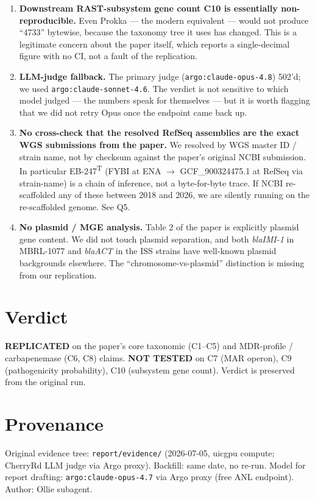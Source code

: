 \documentclass[11pt]{article}
\begin{document}
\begin{enumerate}[leftmargin=*]
    ``pose important health considerations'' clause pivots on a PathogenFinder result we
    did not re-run. PathogenFinder v2 is public and runnable; skipping it was a time
    trade-off, not an inability. Standing follow-up in Q4.
\item \textbf{Downstream RAST-subsystem gene count C10 is essentially non-reproducible.}
    Even Prokka --- the modern equivalent --- would not produce ``4733'' bytewise, because
    the taxonomy tree it uses has changed. This is a legitimate concern about the paper
    itself, which reports a single-decimal figure with no CI, not a fault of the replication.
\item \textbf{LLM-judge fallback.} The primary judge (\texttt{argo:claude-opus-4.8}) 502'd;
    we used \texttt{argo:claude-sonnet-4.6}. The verdict is not sensitive to which model
    judged --- the numbers speak for themselves --- but it is worth flagging that we did not
    retry Opus once the endpoint came back up.
\item \textbf{No cross-check that the resolved RefSeq assemblies are the exact WGS
    submissions from the paper.} We resolved by WGS master ID / strain name, not by
    checksum against the paper's original NCBI submission. In particular EB-247\textsuperscript{T}
    (FYBI at ENA $\to$ GCF\_900324475.1 at RefSeq via strain-name) is a chain of
    inference, not a byte-for-byte trace. If NCBI re-scaffolded any of these between 2018
    and 2026, we are silently running on the re-scaffolded genome. See Q5.
\item \textbf{No plasmid / MGE analysis.} Table 2 of the paper is explicitly plasmid gene
    content. We did not touch plasmid separation, and both \emph{blaIMI-1} in MBRL-1077 and
    \emph{blaACT} in the ISS strains have well-known plasmid backgrounds elsewhere. The
    ``chromosome-vs-plasmid'' distinction is missing from our replication.
\end{enumerate}

\section{Verdict}
\label{sec:verdict}
\textbf{REPLICATED} on the paper's core taxonomic (C1--C5) and MDR-profile / carbapenemase
(C6, C8) claims. \textbf{NOT TESTED} on C7 (MAR operon), C9 (pathogenicity probability),
C10 (subsystem gene count). Verdict is preserved from the original run.



\section*{Provenance}
Original evidence tree: \texttt{report/evidence/} (2026-07-05, uicgpu compute; CherryRd LLM
judge via Argo proxy). Backfill: same date, no re-run. Model for report drafting:
\texttt{argo:claude-opus-4.7} via Argo proxy (free ANL endpoint). Author: Ollie subagent.
\end{document}
